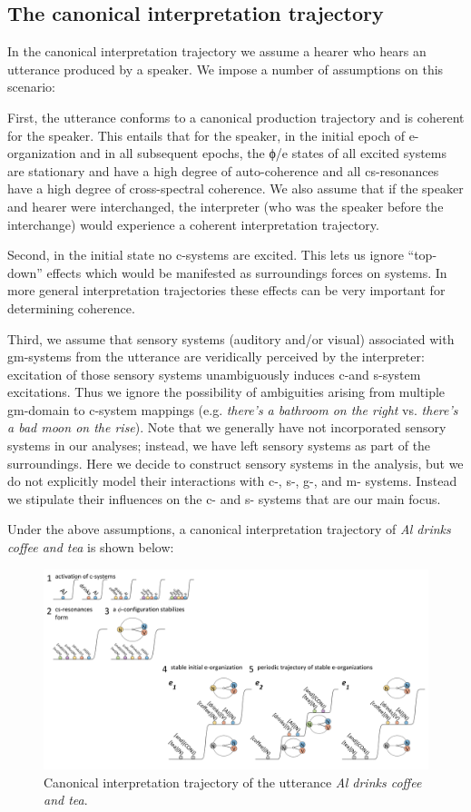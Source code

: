 \subsection{The canonical interpretation trajectory}

In the canonical interpretation trajectory we assume a hearer who hears an utterance produced by a speaker. We impose a number of assumptions on this scenario:

First, the utterance conforms to a canonical production trajectory and is coherent for the speaker. This entails that for the speaker, in the initial epoch of e-organization and in all subsequent epochs, the ϕ/e states of all excited systems are stationary and have a high degree of auto-coherence and all cs-resonances have a high degree of cross-spectral coherence. We also assume that if the speaker and hearer were interchanged, the interpreter (who was the speaker before the interchange) would experience a coherent interpretation trajectory. 

Second, in the initial state no c-systems are excited. This lets us ignore “top-down” effects which would be manifested as surroundings forces on systems. In more general interpretation trajectories these effects can be very important for determining coherence.

Third, we assume that sensory systems (auditory and/or visual) associated with gm-systems from the utterance are veridically perceived by the interpreter: excitation of those sensory systems unambiguously induces c-and s-system excitations. Thus we ignore the possibility of ambiguities arising from multiple gm-domain to c-system mappings (e.g. \textit{there’s a bathroom on the right} vs. \textit{there’s a bad moon on the rise}). Note that we generally have not incorporated sensory systems in our analyses; instead, we have left sensory systems as part of the surroundings. Here we decide to construct sensory systems in the analysis, but we do not explicitly model their interactions with c-, s-, g-, and m- systems. Instead we stipulate their influences on the c- and s- systems that are our main focus.

Under the above assumptions, a canonical interpretation trajectory of \textit{Al drinks coffee and tea} is shown below:

  
\begin{figure}
\includegraphics[width=\textwidth]{figures/Tilsen-img121.png}
\caption{Canonical interpretation trajectory of the utterance \textit{Al drinks coffee and tea}.}
\label{fig:6:2}
\end{figure}

